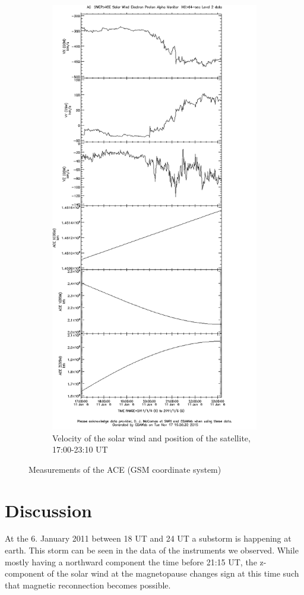 \documentclass[10pt,a4paper]{article}
\begin{document}
\begin{figure}[h]
\begin{subfigure}[h]{.5\textwidth}
		\includegraphics[width=.8\linewidth]{ace-17-2310-v-s.png}
		\caption{Velocity of the solar wind and position of the satellite, 17:00-23:10 UT}
		\label{ace3}
	\end{subfigure}
	\caption{Measurements of the ACE (GSM coordinate system)}
	\label{ace}
\end{figure}


\section{Discussion}

At the 6. January 2011 between 18 UT and 24 UT a substorm is happening at earth. This storm can be seen in the data of the instruments we observed.
While mostly having a northward component the time before 21:15 UT, the z-component of the solar wind at the magnetopause changes sign at this time such that magnetic reconnection becomes possible.
\end{document}
